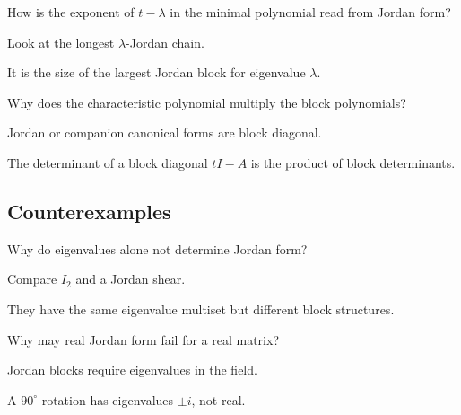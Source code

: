 \begin{exercise}\label{exr:i12-expand-08}
How is the exponent of \(t-\lambda\) in the minimal polynomial read from Jordan form?
\end{exercise}
\begin{hint}
Look at the longest \(\lambda\)-Jordan chain.
\end{hint}
\begin{solution}
It is the size of the largest Jordan block for eigenvalue \(\lambda\).
\end{solution}

\begin{exercise}\label{exr:i12-expand-09}
Why does the characteristic polynomial multiply the block polynomials?
\end{exercise}
\begin{hint}
Jordan or companion canonical forms are block diagonal.
\end{hint}
\begin{solution}
The determinant of a block diagonal \(tI-A\) is the product of block determinants.
\end{solution}

\subsection*{Counterexamples}

\begin{exercise}\label{exr:i12-expand-10}
Why do eigenvalues alone not determine Jordan form?
\end{exercise}
\begin{hint}
Compare \(I_2\) and a Jordan shear.
\end{hint}
\begin{solution}
They have the same eigenvalue multiset but different block structures.
\end{solution}

\begin{exercise}\label{exr:i12-expand-11}
Why may real Jordan form fail for a real matrix?
\end{exercise}
\begin{hint}
Jordan blocks require eigenvalues in the field.
\end{hint}
\begin{solution}
A \(90^\circ\) rotation has eigenvalues \(\pm i\), not real.
\end{solution}

